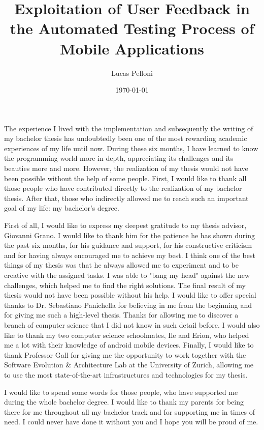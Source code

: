 \documentclass{seal_thesis}
\date{\today}
\title{Exploitation of User Feedback \vspace{0.25em} in the Automated Testing Process of \vspace{0.25em} Mobile Applications}
\author{Lucas Pelloni}
\begin{document}
\maketitle



\frontmatter




\begin{acknowledgements}
The experience I lived with the implementation and subsequently the writing of my bachelor thesis has undoubtedly been one of the most rewarding academic experiences of my life until now. During these six months, I have learned to know the programming world more in depth, appreciating its challenges and its beauties more and more. However, the realization of my thesis would not have been possible without the help of some people. First, I would like to thank all those people who have contributed directly to the realization of my bachelor thesis. After that, those who indirectly allowed me to reach such an important goal of my life: my bachelor’s degree. 

First of all, I would like to express my deepest gratitude to my thesis advisor, Giovanni Grano. I would like to thank him for the patience he has shown during the past six months, for his guidance and support, for his constructive criticism and for having always encouraged me to achieve my best. I think one of the best things of my thesis was that he always allowed me to experiment and to be creative with the assigned tasks. I was able to "bang my head" against the new challenges, which helped me to find the right solutions. The final result of my thesis would not have been possible without his help. I would like to offer special thanks to Dr. Sebastiano Panichella for believing in me from the beginning and for giving me such a high-level thesis. Thanks for allowing me to discover a branch of computer science that I did not know in such detail before. I would also like to thank my two computer science schoolmates, Ile and Erion, who helped me a lot with their knowledge of android mobile devices. Finally, I would like to thank Professor Gall for giving me the opportunity to work together with the Software Evolution \& Architecture Lab at the University of Zurich, allowing me to use the most state-of-the-art infrastructures and technologies for my thesis. 

I would like to spend some words for those people, who have supported me during the whole bachelor degree. I would like to thank my parents for being there for me throughout all my bachelor track and for supporting me in times of need. I could never have done it without you and I hope you will be proud of me. 
\end{acknowledgements}
\end{document}

